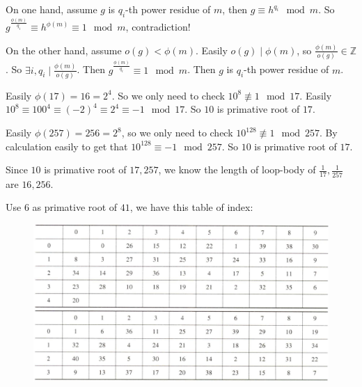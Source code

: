 \documentclass{ctexart}
\newif\ifpreface
\begin{document}
\large
\iffalse
  \setlength{\baselineskip}{1.2em}
  \ifpreface
    
  \else
    \maketitle
  \fi
\fi
{}
\begin{solution}
  On one hand, assume \(g\) is \(q_i\)-th power residue of \(m\), then \(g \equiv h^{q_i} \mod m\).
  So \(g^{\frac{\phi(m)}{q_i}}\equiv h^{\phi(m)}\equiv 1 \mod m\), contradiction!

  On the other hand, assume \(o(g)<\phi(m)\). Easily \(o(g) \mid \phi(m)\), so \(\frac{\phi(m)}{o(g)} \in \mathbb{Z}\).
  So \(\exists i,q_i \mid \frac{\phi(m)}{o(g)}\). Then \(g^{\frac{\phi(m)}{q_i}} \equiv 1 \mod m\).
  Then \(g\) is \(q_i\)-th power residue of \(m\).
\end{solution}

\begin{solution}
  Easily \(\phi(17)=16=2^4\). So we only need to check \(10^8 \not \equiv 1 \mod 17\).
  Easily \(10^8 \equiv 100^4 \equiv (-2)^4 \equiv 2^4 \equiv -1 \mod 17\).
  So \(10\) is primative root of \(17\).

  Easily \(\phi(257)=256=2^8\), so we only need to check \(10^{128} \not \equiv 1 \mod 257\).
  By calculation easily to get that \(10^{128}\equiv -1 \mod 257\).
  So \(10\) is primative root of \(17\).

  Since \(10\) is primative root of \(17,257\), we know the length of loop-body of \(\frac{1}{17},\frac{1}{257}\) are \(16,256\).
\end{solution}

\begin{solution}
  Use \(6\) as primative root of \(41\), we have this table of index:
  \begin{figure}
    \centering
    \includegraphics{./mod41.png}
  \end{figure}

\end{solution}
\end{document}
